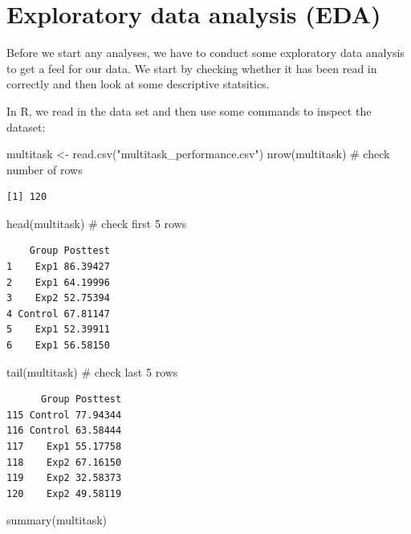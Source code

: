 \documentclass[
  letterpaper,
  DIV=11,
  numbers=noendperiod,
  oneside]{scrreprt}
\newenvironment{Shaded}{\begin{snugshade}}{\end{snugshade}}
\newcommand{\CommentTok}[1]{\textcolor[rgb]{0.37,0.37,0.37}{#1}}
\newcommand{\FunctionTok}[1]{\textcolor[rgb]{0.28,0.35,0.67}{#1}}
\newcommand{\NormalTok}[1]{\textcolor[rgb]{0.00,0.23,0.31}{#1}}
\newcommand{\OtherTok}[1]{\textcolor[rgb]{0.00,0.23,0.31}{#1}}
\newcommand{\StringTok}[1]{\textcolor[rgb]{0.13,0.47,0.30}{#1}}
\begin{document}
\section{Exploratory data analysis
(EDA)}\label{exploratory-data-analysis-eda}

Before we start any analyses, we have to conduct some exploratory data
analysis to get a feel for our data. We start by checking whether it has
been read in correctly and then look at some descriptive statsitics.

In R, we read in the data set and then use some commands to inspect the
dataset:

\begin{Shaded}
\begin{Highlighting}[]
\NormalTok{multitask }\OtherTok{\textless{}{-}} \FunctionTok{read.csv}\NormalTok{(}\StringTok{"multitask\_performance.csv"}\NormalTok{)}
\FunctionTok{nrow}\NormalTok{(multitask) }\CommentTok{\# check number of rows}
\end{Highlighting}
\end{Shaded}

\begin{verbatim}
[1] 120
\end{verbatim}

\begin{Shaded}
\begin{Highlighting}[]
\FunctionTok{head}\NormalTok{(multitask) }\CommentTok{\# check first 5 rows }
\end{Highlighting}
\end{Shaded}

\begin{verbatim}
    Group Posttest
1    Exp1 86.39427
2    Exp1 64.19996
3    Exp2 52.75394
4 Control 67.81147
5    Exp1 52.39911
6    Exp1 56.58150
\end{verbatim}

\begin{Shaded}
\begin{Highlighting}[]
\FunctionTok{tail}\NormalTok{(multitask) }\CommentTok{\# check last 5 rows }
\end{Highlighting}
\end{Shaded}

\begin{verbatim}
      Group Posttest
115 Control 77.94344
116 Control 63.58444
117    Exp1 55.17758
118    Exp2 67.16150
119    Exp2 32.58373
120    Exp2 49.58119
\end{verbatim}

\begin{Shaded}
\begin{Highlighting}[]
\FunctionTok{summary}\NormalTok{(multitask)}
\end{Highlighting}
\end{Shaded}
\end{document}

